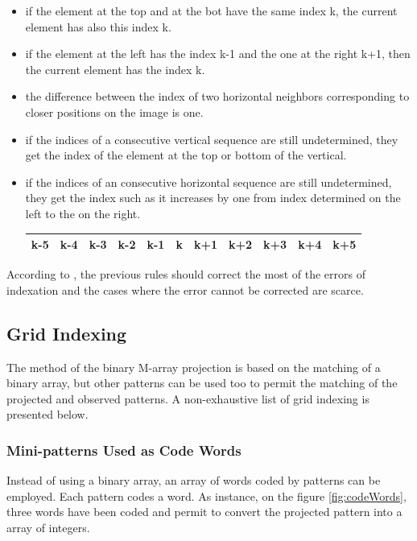 \begin{itemize}
\item if the element at the top and at the bot have the same index k, the current element has also this index k.
\item if the element at the left has the index k-1 and the one at the right k+1, then the current element has the index k.
\item the difference between the index of two horizontal neighbors corresponding to closer positions on the image is one.
\item if the indices of a consecutive vertical sequence are still undetermined, they get the index of the element at the top or bottom of the vertical.

\item if the indices of an consecutive horizontal sequence are still undetermined, they get the index such as it increases by one from index determined on the left to the on the right.
\begin{tabular}{|*{11}{c|}}
    \hline
     k-5  & k-4  & k-3  & \textcolor[rgb]{1,0,0}{k-2}  & \textcolor[rgb]{1,0,0}{k-1}  & \textcolor[rgb]{1,0,0}{k}  & \textcolor[rgb]{1,0,0}{k+1}  & k+2  & k+3  & k+4 & k+5 \\
    \hline
\end{tabular}
\end{itemize}

According to \cite{morita1988reconstruction}, the previous rules should correct the most of the errors of indexation and the cases where the error cannot be corrected are scarce.







\subsection{Grid Indexing}

The method of the binary M-array projection is based on the matching of a binary array, but other patterns can be used too to permit the matching of the projected and observed patterns. A non-exhaustive list of grid indexing is presented below.

\subsubsection{Mini-patterns Used as Code Words}

Instead of using a binary array, an array of words coded by patterns can be employed. Each pattern codes a word. As instance, on the figure \ref{fig:codeWords}, three words have been coded and permit to convert the projected pattern into a array of integers.


